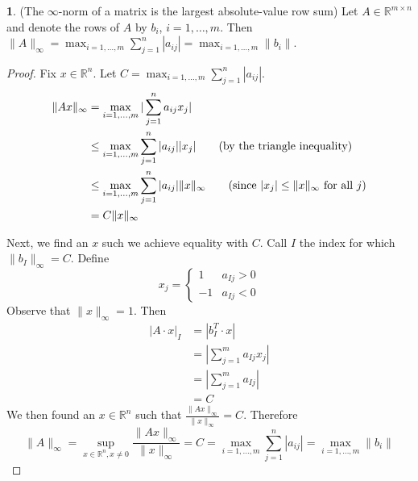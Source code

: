 \documentclass[12pt]{article}
\theoremstyle{definition}
\newcommand{\R}{\mathbb{R}}
\newcommand{\norm}[1]{\lVert#1\rVert}
\newtheorem{theorem}{\color{ForestGreen}{\textbf{Theorem}}}
\theoremstyle{definition}
\begin{document}
\begin{theorem}(The $\infty$-norm of a matrix is the largest absolute-value row sum)
Let $A \in \R^{m \times n }$ and denote the rows of $A$ by $b_i$, $i=1, \ldots, m$. Then $\norm{A}_{\infty} = \max_{i=1, \ldots, m} \sum_{j=1}^{n} |a_{ij}| =  \max_{i=1, \ldots, m} \norm{b_i}$.
\end{theorem}
\begin{proof}
Fix $x \in \R^n$. Let $C = \max_{i=1, \ldots, m} \sum_{j=1}^{n} |a_{ij}|$.
\begin{align*}
	\norm{Ax}_{\infty} &= \max_{i=1,\ldots,m} |\sum_{j=1}^n a_{ij} x_j| \\
	&\leq \max_{i=1,\ldots,m} \sum_{j=1}^n |a_{ij}| |x_j| \tag{by the triangle inequality} \\
	&\leq  \max_{i=1,\ldots,m} \sum_{j=1}^n |a_{ij}| \norm{x}_{\infty} \tag{since $|x_j| \leq \norm{x}_{\infty}$ for all $j$}\\
	&= C \norm{x}_{\infty}
\end{align*}

Next, we find an $x$ such we achieve equality with $C$. Call $I$ the index for which $\norm{b_I}_\infty = C$. Define
\begin{equation}
	x_j = 
	\begin{cases} 
      1 & a_{Ij} > 0 \\
      -1 & a_{Ij} < 0
   \end{cases}
\end{equation}
Observe that $\norm{x}_\infty = 1$. Then
\begin{align*}
	|A\cdot x|_I &= |b_I^T \cdot x| \\
	&=  |\sum_{j=1}^m a_{Ij} x_j | \\
	&= |\sum_{j=1}^m a_{Ij}| \\
	&= C
\end{align*}
We then found an $x \in \R^n$ such that $\frac{\norm{Ax}_\infty}{\norm{x}_\infty} = C$. Therefore 
\begin{equation}
	\norm{A}_\infty = \sup_{x \in \R^n, x\neq 0} \frac{\norm{Ax}_\infty}{\norm{x}_\infty} = C = \max_{i=1, \ldots, m} \sum_{j=1}^{n} |a_{ij}| =  \max_{i=1, \ldots, m} \norm{b_i}
\end{equation}
\end{proof}
\end{document}
